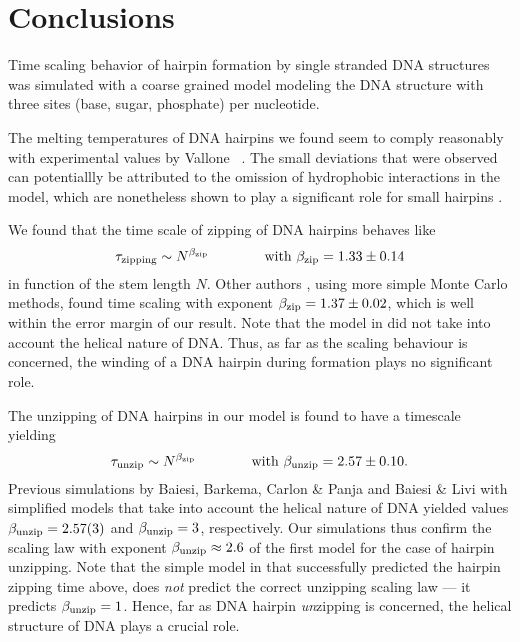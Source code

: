 \section{Conclusions}

Time scaling behavior of hairpin formation by single stranded DNA structures was simulated with a coarse grained model modeling the DNA structure with three sites (base, sugar, phosphate) per nucleotide.

The melting temperatures of DNA hairpins we found seem to comply reasonably with experimental values by Vallone \etal\ \cite{vallone1999melting}. The small deviations that were observed can potentiallly be attributed to the omission of hydrophobic interactions in the model, which are nonetheless shown to play a significant role for small hairpins \cite{kuznetsov2001semiflexible}.

We found that the time scale of zipping of DNA hairpins behaves like
\begin{equation}
\tau_\text{zipping} \sim N^{{\beta_\text{zip}}} \qquad \qquad \text{with}\ {\beta_\text{zip}} = 1.33\pm0.14
\end{equation}
in function of the stem length $N$. Other authors \cite{carlon2011anomalous}, using more simple Monte Carlo methods, found time scaling with exponent ${\beta_\text{zip}} = 1.37 \pm 0.02$, which is well within the error margin of our result. Note that the model in \cite{carlon2011anomalous} did not take into account the helical nature of DNA. Thus, as far as the scaling behaviour is concerned, the winding of a DNA hairpin during formation plays no significant role.

The unzipping of DNA hairpins in our model is found to have a timescale yielding
\begin{equation}
{\ensuremath{\tau_\text{unzip}}} \sim N^{{\beta_\text{zip}}} \qquad \qquad \text{with}\ {\beta_\text{unzip}} = 2.57\pm0.10.
\end{equation}
Previous simulations by Baiesi, Barkema, Carlon \& Panja \cite{carlon2010unwinding} and Baiesi \& Livi \cite{baiesi2009multiple} with simplified models that take into account the helical nature of DNA yielded values ${\beta_\text{unzip}} = 2.57(3)$ and ${\beta_\text{unzip}} = 3$, respectively. Our simulations thus confirm the scaling law with exponent ${\beta_\text{unzip}} \approx 2.6$ of the first model \cite{carlon2010unwinding} for the case of hairpin unzipping. Note that the simple model in \cite{carlon2011anomalous} that successfully predicted the hairpin zipping time above, does \emph{not} predict the correct unzipping scaling law --- it predicts ${\beta_\text{unzip}} = 1$. Hence, far as DNA hairpin \emph{un}zipping is concerned, the helical structure of DNA plays a crucial role.


